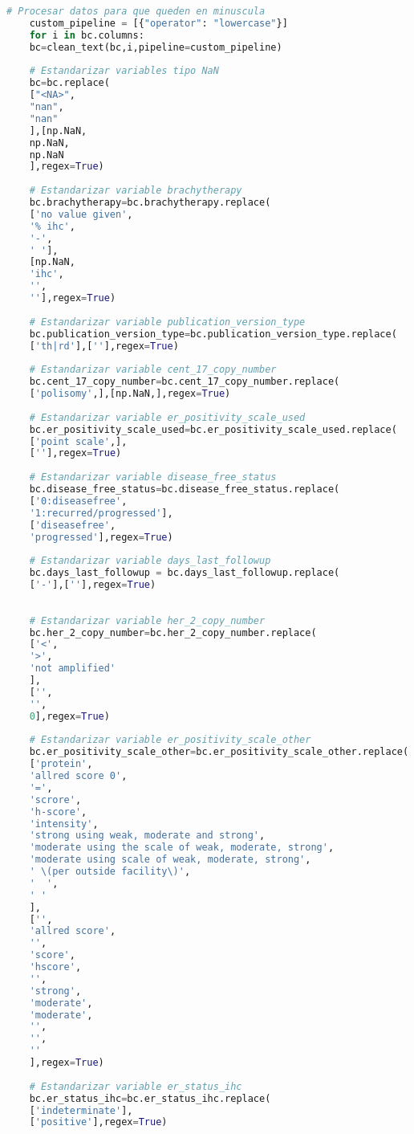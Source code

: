 \begin{lstlisting}[basicstyle=\scriptsize,language=Python, label=estandarizacion, caption=Estandarización de datos genómicos en Python.]
	# Procesar datos para que queden en minuscula
	custom_pipeline = [{"operator": "lowercase"}]
	for i in bc.columns:
	bc=clean_text(bc,i,pipeline=custom_pipeline)
	
	# Estandarizar variables tipo NaN
	bc=bc.replace(
	["<NA>",
	"nan",
	"nan"
	],[np.NaN,
	np.NaN,
	np.NaN
	],regex=True)
	
	# Estandarizar variable brachytherapy
	bc.brachytherapy=bc.brachytherapy.replace(
	['no value given',
	'% ihc',
	'-',
	' '],
	[np.NaN,
	'ihc',
	'',
	''],regex=True)
	
	# Estandarizar variable publication_version_type
	bc.publication_version_type=bc.publication_version_type.replace(
	['th|rd'],[''],regex=True)
	
	# Estandarizar variable cent_17_copy_number
	bc.cent_17_copy_number=bc.cent_17_copy_number.replace(
	['polisomy',],[np.NaN,],regex=True)
	
	# Estandarizar variable er_positivity_scale_used
	bc.er_positivity_scale_used=bc.er_positivity_scale_used.replace(
	['point scale',],
	[''],regex=True)
	
	# Estandarizar variable disease_free_status
	bc.disease_free_status=bc.disease_free_status.replace(
	['0:diseasefree',
	'1:recurred/progressed'],
	['diseasefree',
	'progressed'],regex=True)
	
	# Estandarizar variable days_last_followup
	bc.days_last_followup = bc.days_last_followup.replace(
	['-'],[''],regex=True)
	
	
	# Estandarizar variable her_2_copy_number
	bc.her_2_copy_number=bc.her_2_copy_number.replace(
	['<',
	'>',
	'not amplified'
	],
	['',
	'',
	0],regex=True)
	
	# Estandarizar variable er_positivity_scale_other
	bc.er_positivity_scale_other=bc.er_positivity_scale_other.replace(
	['protein',
	'allred score 0',
	'=',
	'scrore',
	'h-score',
	'intensity',
	'strong using weak, moderate and strong',
	'moderate using the scale of weak, moderate, strong',
	'moderate using scale of weak, moderate, strong',
	' \(per outside facility\)',
	'  ',
	' '
	],
	['',
	'allred score',
	'',
	'score',
	'hscore',
	'',
	'strong',
	'moderate',
	'moderate',
	'',
	'',
	''
	],regex=True)
	
	# Estandarizar variable er_status_ihc
	bc.er_status_ihc=bc.er_status_ihc.replace(
	['indeterminate'],
	['positive'],regex=True)
	

\end{lstlisting}
